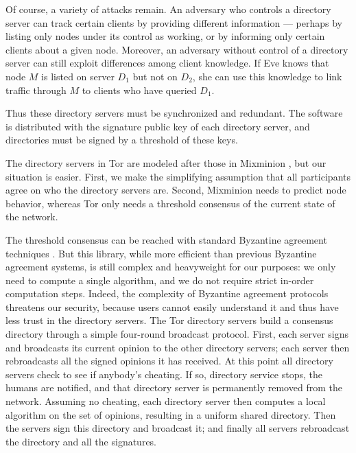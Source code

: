 \documentclass[times,10pt,twocolumn]{article}
\begin{document}
Of course, a variety of attacks remain. An adversary who controls a
directory server can track certain clients by providing different
information --- perhaps by listing only nodes under its control
as working, or by informing only certain clients about a given
node. Moreover, an adversary without control of a directory server can
still exploit differences among client knowledge. If Eve knows that
node $M$ is listed on server $D_1$ but not on $D_2$, she can use this
knowledge to link traffic through $M$ to clients who have queried $D_1$.

Thus these directory servers must be synchronized and redundant. The
software is distributed with the signature public key of each directory
server, and directories must be signed by a threshold of these keys.

The directory servers in Tor are modeled after those in Mixminion
\cite{minion-design}, but our situation is easier. First, we make the
simplifying assumption that all participants agree on who the
directory servers are. Second, Mixminion needs to predict node
behavior, whereas Tor only needs a threshold consensus of the current
state of the network.

The threshold consensus can be reached with standard Byzantine agreement
techniques \cite{castro-liskov}.  
But this library, while more efficient than previous Byzantine agreement
systems, is still complex and heavyweight for our purposes: we only need
to compute a single algorithm, and we do not require strict in-order
computation steps. Indeed, the complexity of Byzantine agreement protocols
threatens our security, because users cannot easily understand it and
thus have less trust in the directory servers. The Tor directory servers
build a consensus directory
through a simple four-round broadcast protocol. First, each server signs
and broadcasts its current opinion to the other directory servers; each
server then rebroadcasts all the signed opinions it has received. At this
point all directory servers check to see if anybody's cheating. If so,
directory service stops, the humans are notified, and that directory
server is permanently removed from the network. Assuming no cheating,
each directory server then computes a local algorithm on the set of
opinions, resulting in a uniform shared directory. Then the servers sign
this directory and broadcast it; and finally all servers rebroadcast
the directory and all the signatures.
\end{document}
